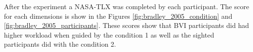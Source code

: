 \begin{figure}[htbp]
\centering
\begin{minipage}{.45\linewidth}
    \centering
    \resizebox{\linewidth}{!}{
    
    }
    \label{fig:bradley_2005}
\end{minipage}
\begin{minipage}{.1\linewidth}
\end{minipage}
\begin{minipage}{.45\linewidth}
    \centering
    \resizebox{\linewidth}{!}{
    
    }
    \label{fig:bradley_2005_2}
\end{minipage}
\end{figure}


After the experiment a NASA-TLX was completed by each participant. The score for each dimensions is show in the Figures \ref{fig:bradley_2005_condition} and \ref{fig:bradley_2005_participants}. These scores show that BVI participants did had higher workload when guided by the condition 1 as well as the sighted participants did with the condition 2.

